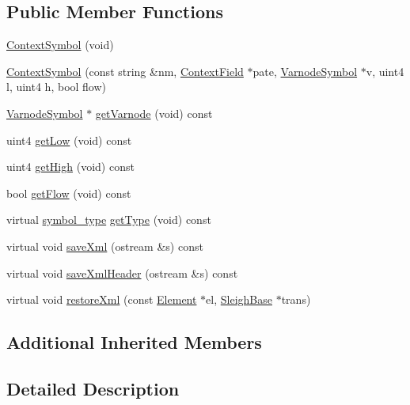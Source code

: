 \subsection*{Public Member Functions}
\begin{DoxyCompactItemize}
\item 
\mbox{\hyperlink{class_context_symbol_aea7c56013fda3735d07d95347a6b17d4}{Context\+Symbol}} (void)
\item 
\mbox{\hyperlink{class_context_symbol_a4cd97b7372ebfced19b138a3910c0a66}{Context\+Symbol}} (const string \&nm, \mbox{\hyperlink{class_context_field}{Context\+Field}} $\ast$pate, \mbox{\hyperlink{class_varnode_symbol}{Varnode\+Symbol}} $\ast$v, uint4 l, uint4 h, bool flow)
\item 
\mbox{\hyperlink{class_varnode_symbol}{Varnode\+Symbol}} $\ast$ \mbox{\hyperlink{class_context_symbol_a572d945395d5e8d456c7a61f378b2db4}{get\+Varnode}} (void) const
\item 
uint4 \mbox{\hyperlink{class_context_symbol_a3564b53a8af4f8a3fcc3a601fd783c73}{get\+Low}} (void) const
\item 
uint4 \mbox{\hyperlink{class_context_symbol_ac8df735881b80f4bab2ab25e59af9cf9}{get\+High}} (void) const
\item 
bool \mbox{\hyperlink{class_context_symbol_adaee13c8da1d8811fc854da9b074ff0f}{get\+Flow}} (void) const
\item 
virtual \mbox{\hyperlink{class_sleigh_symbol_aba70f7f332fd63488c5ec4bd7807db41}{symbol\+\_\+type}} \mbox{\hyperlink{class_context_symbol_ab732b095055fe2b48f4ffccdce790f60}{get\+Type}} (void) const
\item 
virtual void \mbox{\hyperlink{class_context_symbol_ad8c4f39c37d11ed5f0fd7bf4eb59dca6}{save\+Xml}} (ostream \&s) const
\item 
virtual void \mbox{\hyperlink{class_context_symbol_a4a9e76b855af1a02bc7ab142d041db87}{save\+Xml\+Header}} (ostream \&s) const
\item 
virtual void \mbox{\hyperlink{class_context_symbol_a3ea7d156033d1dc82c9c3452496641a9}{restore\+Xml}} (const \mbox{\hyperlink{class_element}{Element}} $\ast$el, \mbox{\hyperlink{class_sleigh_base}{Sleigh\+Base}} $\ast$trans)
\end{DoxyCompactItemize}
\subsection*{Additional Inherited Members}


\subsection{Detailed Description}


